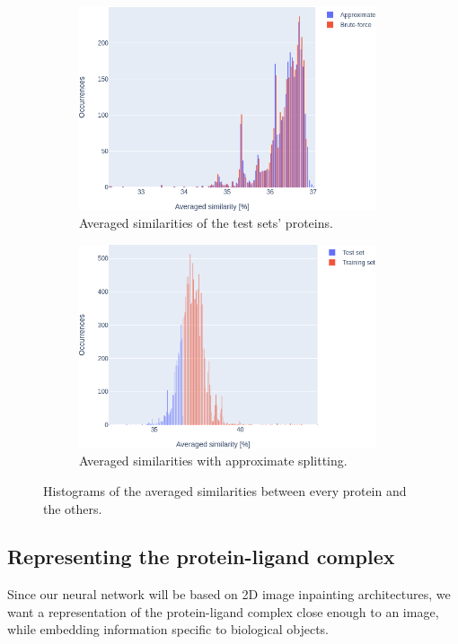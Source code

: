 \documentclass{article}
\begin{document}
\begin{figure}[H]
    \centering
    \begin{subfigure}{.5\textwidth}
        \centering
        \includegraphics[height=6cm,width=\textwidth,keepaspectratio]{splitting_test_sets.png}
        \caption{Averaged similarities of the test sets' proteins.}
        \label{fig:splitting_test_sets}
    \end{subfigure}%
    \begin{subfigure}{.5\textwidth}
        \centering
        \includegraphics[height=6cm,width=\textwidth,keepaspectratio]{splitting_sets.png}
        \caption{Averaged similarities with approximate splitting.}
        \label{fig:splitting_sets}
    \end{subfigure}
    \caption{Histograms of the averaged similarities between every protein and the others.}
    \label{fig:splitting}
\end{figure}

\subsection{Representing the protein-ligand complex}

Since our neural network will be based on 2D image inpainting architectures, we want a representation of the protein-ligand complex close enough to an image, while embedding information specific to biological objects. \\
\end{document}
